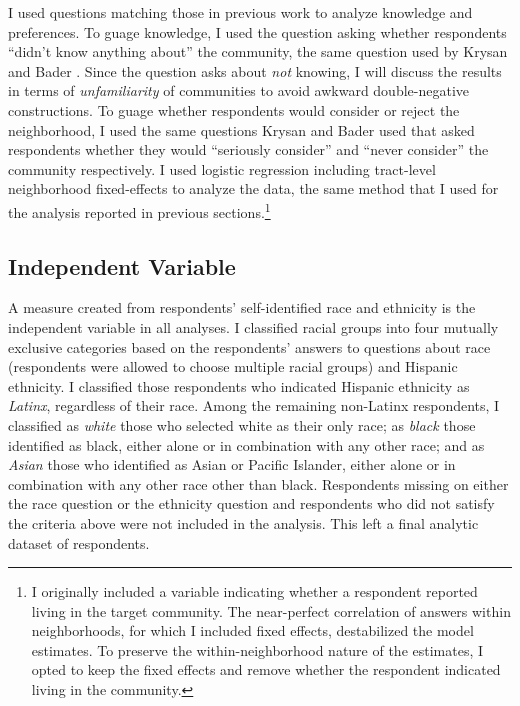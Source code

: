 \documentclass{baderart}
\newcommand{\TK}[1][]{\strong{TK #1}}
\begin{document}
I used questions matching those in previous work to analyze knowledge and preferences. To guage knowledge, I used the question asking whether respondents ``didn't know anything about'' the community, the same question used by Krysan and Bader \citeyearpar{krysan_racial_2009}. Since the question asks about \emph{not} knowing, I will discuss the results in terms of \emph{unfamiliarity} of communities to avoid awkward double-negative constructions. To guage whether respondents would consider or reject the neighborhood, I used the same questions Krysan and Bader \citeyearpar[][\citealt{bader_community_2015}]{krysan_perceiving_2007, krysan_racial_2009} used that asked respondents whether they would ``seriously consider'' and ``never consider'' the community respectively. I used logistic regression including tract-level neighborhood fixed-effects to analyze the data, the same method that I used for the analysis reported in previous sections.\footnote{I originally included a variable indicating whether a respondent reported living in the target community. The near-perfect correlation of answers within neighborhoods, for which I included fixed effects, destabilized the model estimates. To preserve the within-neighborhood nature of the estimates, I opted to keep the fixed effects and remove whether the respondent indicated living in the community.}

\subsection{Independent Variable}\label{independent-variable}

A measure created from respondents' self-identified race and ethnicity is the independent variable in all analyses. I classified racial groups into four mutually exclusive categories based on the respondents' answers to questions about race (respondents were allowed to choose multiple racial groups) and Hispanic ethnicity. 
I classified those respondents who indicated Hispanic ethnicity as \emph{Latinx}, regardless of their race. Among the remaining non-Latinx respondents, I classified as \emph{white} those who selected white as their only race; as \emph{black} those identified as black, either alone or in combination with any other race; and as \emph{Asian} those who identified as Asian or Pacific Islander, either alone or in combination with any other race other than black. Respondents missing on either the race question or the ethnicity question and respondents who did not satisfy the criteria above were not included in the analysis. This left a final analytic dataset of \TK[N] respondents.
\end{document}
